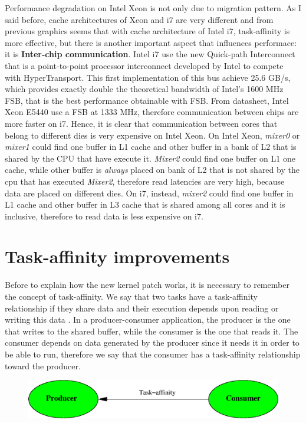 Performance degradation on Intel Xeon is not only due to migration pattern. As I said before, cache architectures of Xeon and i7 are very different and
from previous graphics seems that with cache architecture of Intel i7, task-affinity is more effective, but there is another important aspect that 
influences performace: it is \textbf{Inter-chip communication}. Intel i7 use the new Quick-path Interconnect that is a point-to-point processor 
interconnect developed by Intel to compete with HyperTransport. This first implementation of this bus achieve 25.6 GB/s, which provides exactly double the 
theoretical bandwidth of Intel's 1600 MHz FSB, that is the best performance obtainable with FSB. From datasheet, Intel Xeon E5440 use a FSB at 1333 MHz, 
therefore communication between chips are more faster on i7. Hence, it is clear that communication between cores that belong to different dies is very 
expensive on Intel Xeon. On Intel Xeon, \textit{mixer0} or \textit{mixer1} could find one buffer in L1 cache and other buffer in a bank of L2 that is 
shared by the CPU that have execute it. \textit{Mixer2} could find one buffer on L1 one cache, while other buffer is \textit{always} placed on bank of L2 
that is not shared by the cpu that has executed \textit{Mixer2}, therefore read latencies are very high, because data are placed on different dies. 
On i7, instead, \textit{mixer2} could find one buffer in L1 cache and other buffer in L3 cache that is shared among all cores and it is inclusive, 
therefore to read data is less expensive on i7.

\section{Task-affinity improvements}

Before to explain how the new kernel patch works, it is necessary to remember the concept of task-affinity. We say that two tasks have a task-affinity 
relationship if they share data and their execution depends upon reading or writing this data \cite{lcs}. In a producer-consumer application, the 
producer is the one that writes to the shared buffer, while the consumer is the one that reads it. The consumer depends on data generated by the producer 
since it needs it in order to be able to run, therefore we say that the consumer has a task-affinity relationship toward the producer.

\begin{figure}[htbp]
\centering
\includegraphics[width=\widefigure]{images/taskaff-rel.eps}
\caption{}
\label{fig:taskaff-rel}
\end{figure}

